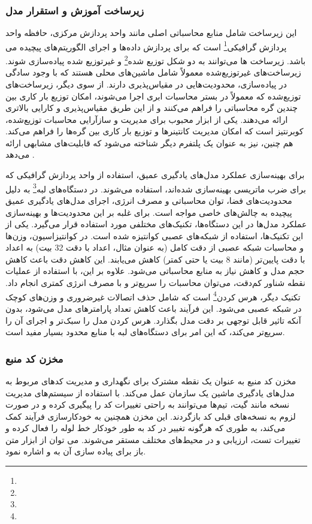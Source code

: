 \subsubsection{زیرساخت آموزش و استقرار مدل}
این زیرساخت شامل منابع محاسباتی اصلی مانند واحد پردازش مرکزی، حافظه واحد پردازش گرافیکی\footnote{} است که برای پردازش داده‌ها و اجرای الگوریتم‌های پیچیده می باشد. زیرساخت ها می‌توانند به دو شکل توزیع شده\footnote{} و غیرتوزیع شده پیاده‌سازی شوند. زیرساخت‌های غیرتوزیع‌شده معمولاً شامل ماشین‌های محلی هستند که با وجود سادگی در پیاده‌سازی، محدودیت‌هایی در مقیاس‌پذیری دارند. از سوی دیگر، زیرساخت‌های توزیع‌شده که معمولاً در بستر محاسبات ابری اجرا می‌شوند، امکان توزیع بار کاری بین چندین گره محاسباتی را فراهم می‌کنند و از این طریق مقیاس‌پذیری و کارایی بالاتری ارائه می‌دهند. یکی از ابزار محبوب برای مدیریت و سازآرایی محاسبات توزیع‌شده، کوبرنتیز است که امکان مدیریت کانتینرها و توزیع بار کاری بین گره‌ها را فراهم می‌کند. هم چنین،  نیز به عنوان یک پلتفرم دیگر شناخته می‌شود که قابلیت‌های مشابهی ارائه می‌دهد \cite{MLOpsCloud1}.

برای بهینه‌سازی عملکرد مدل‌های یادگیری عمیق، استفاده از واحد پردازش گرافیکی که برای ضرب ماتریسی بهینه‌سازی شده‌اند، استفاده می‌شوند. در دستگاه‌های لبه‌\footnote{} به دلیل محدودیت‌های فضا، توان محاسباتی و مصرف انرژی، اجرای مدل‌های یادگیری عمیق پیچیده به چالش‌های خاصی مواجه است. برای غلبه بر این محدودیت‌ها و بهینه‌سازی عملکرد مدل‌ها در این دستگاه‌ها، تکنیک‌های مختلفی مورد استفاده قرار می‌گیرد. یکی از این تکنیک‌ها، استفاده از شبکه‌های عصبی کوانتیزه شده است. در کوانتیزاسیون، وزن‌ها و محاسبات شبکه عصبی از دقت کامل (به عنوان مثال، اعداد با دقت 32 بیت) به اعداد با دقت پایین‌تر (مانند 8 بیت یا حتی کمتر) کاهش می‌یابند. این کاهش دقت باعث کاهش حجم مدل و کاهش نیاز به منابع محاسباتی می‌شود. علاوه بر این، با استفاده از عملیات نقطه شناور کم‌دقت، می‌توان محاسبات را سریع‌تر و با مصرف انرژی کمتری انجام داد. تکنیک دیگر، هرس کردن\footnote{} است که شامل حذف اتصالات غیرضروری و وزن‌های کوچک در شبکه عصبی می‌شود. این فرآیند باعث کاهش تعداد پارامترهای مدل می‌شود، بدون آنکه تاثیر قابل توجهی بر دقت مدل بگذارد. هرس کردن مدل را سبک‌تر و اجرای آن را سریع‌تر می‌کند، که این امر برای دستگاه‌های لبه‌ با منابع محدود بسیار مفید است.


\subsubsection{مخزن کد منبع}
مخزن کد منبع به عنوان یک نقطه مشترک برای نگهداری و مدیریت کدهای مربوط به مدل‌های یادگیری ماشین یک سازمان عمل می‌کند. با استفاده از سیستم‌های مدیریت نسخه مانند گیت، تیم‌ها می‌توانند به راحتی تغییرات کد را پیگیری کرده و در صورت لزوم به نسخه‌های قبلی کد بازگردند. این مخزن همچنین به خودکارسازی فرآیند  کمک می‌کند، به طوری که هرگونه تغییر در کد به طور خودکار خط لوله را فعال کرده و  تغییرات تست، ارزیابی و در محیط‌های مختلف مستقر می‌شوند. می توان از ابزار متن باز برای پیاده سازی آن به \cite{GitLab} و \cite{Gerrit} اشاره نمود.
